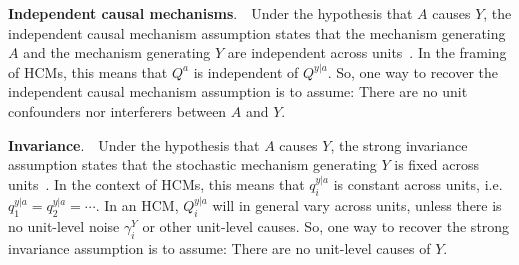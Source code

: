 \documentclass[12pt]{article}
\newcommand{\parhead}[1]{\vspace{0.1in} \noindent \textbf{#1}. \,\,}
\begin{document}
\parhead{Independent causal mechanisms}
Under the hypothesis that $A$ causes $Y$, the independent causal mechanism assumption states that the mechanism generating $A$ and the mechanism generating $Y$ are independent across units~\citep[Chapters 2, 4][]{Peters2017-ww,Perry2022-ah,Guo2022-bl}.
In the framing of HCMs, this means that $Q^a$ is independent of $Q^{y|a}$.
So, one way to recover the independent causal mechanism assumption is to assume: There are no unit confounders nor interferers between $A$ and $Y$.

\parhead{Invariance}
Under the hypothesis that $A$ causes $Y$, the strong invariance assumption states that the stochastic mechanism generating $Y$ is fixed across units~\citep{Peters2015-uw,Yin2021-ma}.
In the context of HCMs, this means that $q^{y|a}_i$ is constant across units, i.e. $q^{y|a}_1 = q^{y|a}_2 = \cdots$.
In an HCM, $Q^{y|a}_i$ will in general vary across units, unless there is no unit-level noise $\gamma^Y_i$ or other unit-level causes. 
So, one way to recover the strong invariance assumption is to assume: There are no unit-level causes of $Y$.




 
\end{document}
